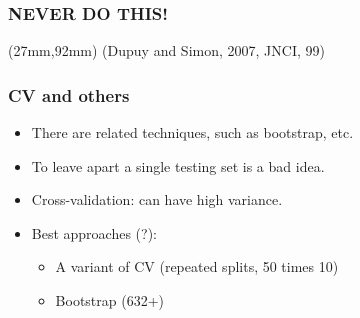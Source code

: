 \begin{frame}
\frametitle{NEVER DO THIS!}
  \vspace*{-5cm}
  
  \TPMargin{0pt}
  \begin{textblock*}{43mm}(27mm,92mm)
    {\tiny(Dupuy and Simon, 2007, JNCI, 99)}
  \end{textblock*}

  
\end{frame}





\begin{frame}
\frametitle{CV and others}


\begin{itemize}
\item There are related techniques, such as bootstrap, etc.
\item To leave apart a single testing set is a bad idea.

\item Cross-validation: can have high variance.
\item Best approaches (?):
  \begin{itemize}
  \item A variant of CV (repeated splits, 50 times 10)
  \item Bootstrap (632+)
  \end{itemize}
\end{itemize}
\end{frame}



